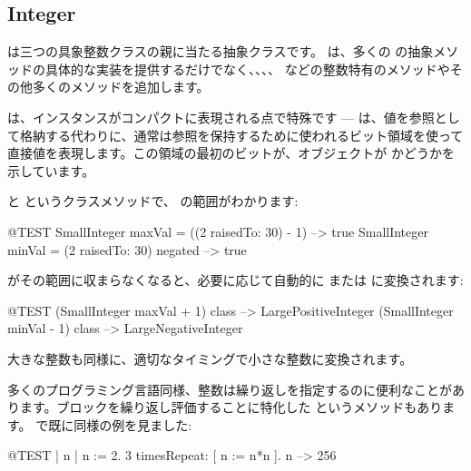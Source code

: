 \documentclass[a4paper,10pt,twoside]{book}
\begin{document}

\subsection{Integer}

 は三つの具象整数クラスの親に当たる抽象クラスです。 は、多くの  の抽象メソッドの具体的な実装を提供するだけでなく、、、、 などの整数特有のメソッドやその他多くのメソッドを追加します。

 は、インスタンスがコンパクトに表現される点で特殊です ---  は、値を参照として格納する代わりに、通常は参照を保持するために使われるビット領域を使って直接値を表現します。この領域の最初のビットが、オブジェクトが  かどうかを示しています。%

 と  というクラスメソッドで、 の範囲がわかります:

\begin{code}{@TEST}
SmallInteger maxVal = ((2 raisedTo: 30) - 1)      --> true
SmallInteger minVal = (2 raisedTo: 30) negated --> true
\end{code}

 がその範囲に収まらなくなると、必要に応じて自動的に  または  に変換されます:

\begin{code}{@TEST}
(SmallInteger maxVal + 1) class --> LargePositiveInteger
(SmallInteger minVal - 1) class  --> LargeNegativeInteger
\end{code}

大きな整数も同様に、適切なタイミングで小さな整数に変換されます。%

多くのプログラミング言語同様、整数は繰り返しを指定するのに便利なことがあります。ブロックを繰り返し評価することに特化した  というメソッドもあります。%
で既に同様の例を見ました:%
\begin{code}{@TEST | n |}
n := 2.
3 timesRepeat: [ n := n*n ].
n --> 256
\end{code}
\end{document}
